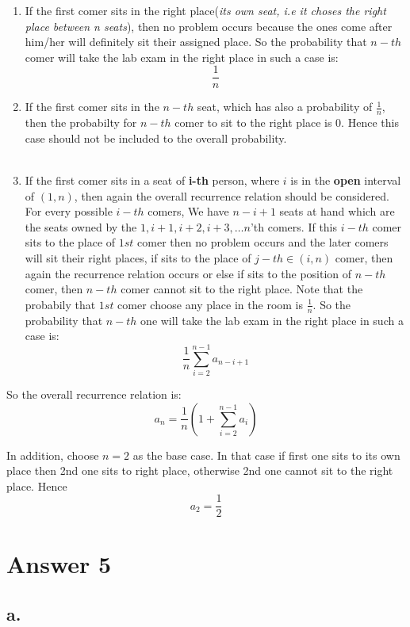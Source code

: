 \documentclass[12pt]{article}
\begin{document}
\begin{enumerate}[label=\roman*]

\item 
If the first comer sits in the right place(\textit{its own seat, i.e it choses the right place between n seats}), then no problem occurs because the ones come after him/her will definitely sit their assigned place. So the probability that $n-th$ comer will take the lab exam in the right place in such a case is: $$\frac{1}{n}$$
\item 
If the first comer sits in the $n-th$ seat, which has also a probability of $\frac{1}{n}$, then the probabilty for $n-th$ comer to sit to the right place is $0$. Hence this case should not be included to the overall probability.\\ \\
\item 
If the first comer sits in a seat of \textbf{i-th} person, where $i$ is in the \textbf{open} interval of $(1,n)$, then again the overall recurrence relation should be considered. For every possible $i-th$ comers, We have $n-i+1$ seats at hand which are the seats owned by the $1, i+1, i+2, i+3,\dots n$'th comers. If this $i-th$ comer sits to the place of $1st$ comer then no problem occurs and the later comers will sit their right places, if sits to the place of $j-th \in (i, n)$ comer, then again the recurrence relation occurs or else if sits to the position of $n-th$ comer, then $n-th$ comer cannot sit to the right place. Note that the probabily that $1st$ comer choose any place in the room is $\frac{1}{n}$. So the probability that $n-th$ one will take the lab exam in the right place in such a case is: $$\frac{1}{n} \sum_{i=2}^{n-1}a_{n-i+1}$$
\end{enumerate}

So the overall recurrence relation is: $$a_n=\frac{1}{n}(1+\sum_{i=2}^{n-1}a_i)$$

In addition, choose $n=2$ as the base case. In that case if first one sits to its own place then 2nd one sits to right place, otherwise 2nd one cannot sit to the right place. Hence $$a_2=\frac{1}{2}$$

\section*{Answer 5}
\subsection*{a.}
\end{document}
